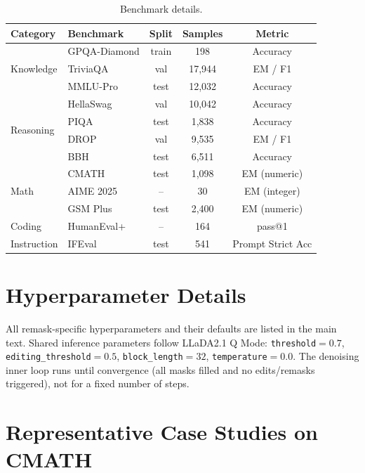 \documentclass{article}
\begin{document}
\begin{table}[h]
\centering
\caption{Benchmark details.}
\label{tab:benchmark_details}
\small
\begin{tabular}{llccc}
\toprule
\textbf{Category} & \textbf{Benchmark} & \textbf{Split} & \textbf{Samples} & \textbf{Metric} \\
\midrule
\multirow{3}{*}{Knowledge}
& GPQA-Diamond   & train & 198     & Accuracy    \\
& TriviaQA       & val   & 17,944  & EM / F1     \\
& MMLU-Pro       & test  & 12,032  & Accuracy    \\
\midrule
\multirow{4}{*}{Reasoning}
& HellaSwag      & val   & 10,042  & Accuracy    \\
& PIQA           & test  & 1,838   & Accuracy    \\
& DROP           & val   & 9,535   & EM / F1     \\
& BBH            & test  & 6,511   & Accuracy    \\
\midrule
\multirow{3}{*}{Math}
& CMATH            & test     & 1,098 & EM (numeric) \\
& AIME 2025        & --       & 30    & EM (integer) \\
& GSM Plus         & test     & 2,400 & EM (numeric) \\
\midrule
Coding
& HumanEval+ & --  & 164 & pass@1 \\
\midrule
Instruction
& IFEval         & test  & 541   & Prompt Strict Acc \\
\bottomrule
\end{tabular}
\end{table}

\section{Hyperparameter Details}
\label{app:hyperparams}

All remask-specific hyperparameters and their defaults are listed in the main text. Shared inference parameters follow LLaDA2.1 Q Mode: \texttt{threshold}$=0.7$, \texttt{editing\_threshold}$=0.5$, \texttt{block\_length}$=32$, \texttt{temperature}$=0.0$. The denoising inner loop runs until convergence (all masks filled and no edits/remasks triggered), not for a fixed number of steps.

\section{Representative Case Studies on CMATH}
\label{app:cases}
\end{document}
